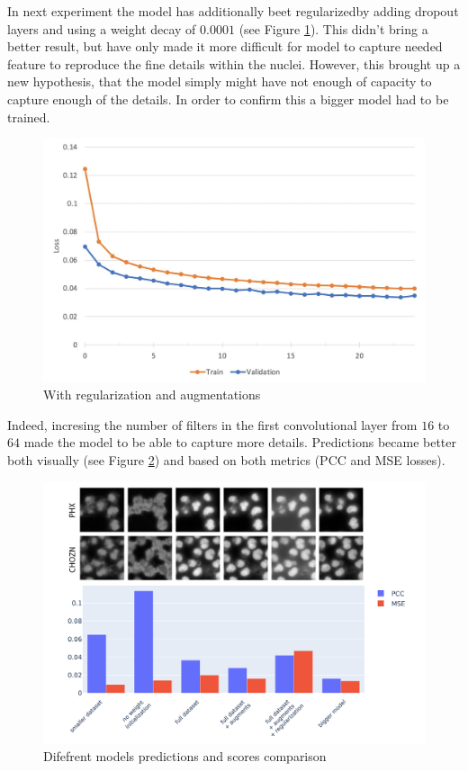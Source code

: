 In next experiment the model has additionally beet regularizedby adding dropout layers and using a weight decay of $0.0001$ (see Figure \ref{fig:full-dataset-pcc-regularized}). This didn't bring a better result, but have only made it more difficult for model to capture needed feature to reproduce the fine details within the nuclei. However, this brought up a new hypothesis, that the model simply might have not enough of capacity to capture enough of the details. In order to confirm this a bigger model had to be trained.
\begin{figure}[H]
	\begin{center}
		\includegraphics[width=0.5\linewidth]{bilder/nuclei/full-dataset-regularized.jpg}
		\caption{With regularization and augmentations}\label{fig:full-dataset-pcc-regularized}
	\end{center}
\end{figure}

Indeed, incresing the number of filters in the first convolutional layer from $16$ to $64$ made the model to be able to capture more details. Predictions became better both visually (see Figure \ref{fig:nuclei-comparison-predictions}) and based on both metrics (PCC and MSE losses).
\begin{figure}[H]
	\begin{center}
		\includegraphics[width=0.5\linewidth]{bilder/nuclei/comparison-chzn-phx.png}
		\caption{Difefrent models predictions and scores comparison}\label{fig:nuclei-comparison-predictions}
	\end{center}
\end{figure}

